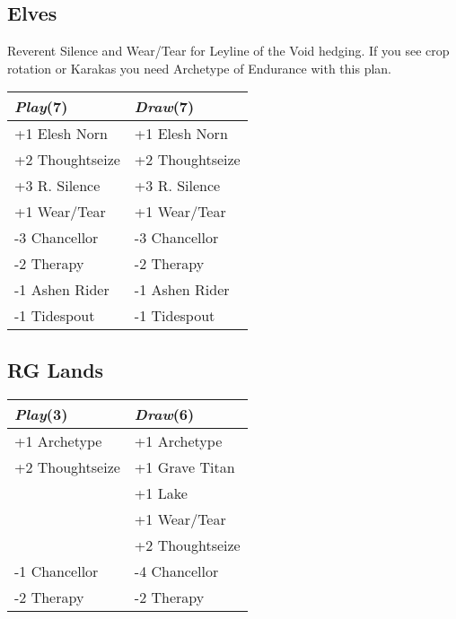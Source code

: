 \documentclass{article}
\renewcommand *\contentsname{Contents}
\begin{document}
\begin{multicols}{2}
\subsection*{Elves}
Reverent Silence and Wear/Tear for Leyline of the Void hedging. If you see crop rotation or Karakas you need Archetype of Endurance with this plan.\begin{center}
\begin{tabular}{| l | l |}
\hline
\textit{Play}(7) & \textit{Draw}(7) \\
\hline
\cellcolor[HTML]{BBDDBB}\small{+1 Elesh Norn} & \cellcolor[HTML]{BBDDBB}\small{+1 Elesh Norn}\\
\cellcolor[HTML]{BBDDBB}\small{+2 Thoughtseize} & \cellcolor[HTML]{BBDDBB}\small{+2 Thoughtseize}\\
\cellcolor[HTML]{BBDDBB}\small{+3 R. Silence} & \cellcolor[HTML]{BBDDBB}\small{+3 R. Silence}\\
\cellcolor[HTML]{BBDDBB}\small{+1 Wear/Tear} & \cellcolor[HTML]{BBDDBB}\small{+1 Wear/Tear}\\
\cellcolor[HTML]{DDBBBB}\small{-3 Chancellor} & \cellcolor[HTML]{DDBBBB}\small{-3 Chancellor}\\
\cellcolor[HTML]{DDBBBB}\small{-2 Therapy} & \cellcolor[HTML]{DDBBBB}\small{-2 Therapy}\\
\cellcolor[HTML]{DDBBBB}\small{-1 Ashen Rider} & \cellcolor[HTML]{DDBBBB}\small{-1 Ashen Rider}\\
\cellcolor[HTML]{DDBBBB}\small{-1 Tidespout} & \cellcolor[HTML]{DDBBBB}\small{-1 Tidespout}\\
\hline
\end{tabular}
\end{center}
\subsection*{RG Lands}
\begin{center}
\begin{tabular}{| l | l |}
\hline
\textit{Play}(3) & \textit{Draw}(6) \\
\hline
\cellcolor[HTML]{BBDDBB}\small{+1 Archetype} & \cellcolor[HTML]{BBDDBB}\small{+1 Archetype}\\
\cellcolor[HTML]{BBDDBB}\small{+2 Thoughtseize} & \cellcolor[HTML]{BBDDBB}\small{+1 Grave Titan}\\
 & \cellcolor[HTML]{BBDDBB}\small{+1 Lake}\\
 & \cellcolor[HTML]{BBDDBB}\small{+1 Wear/Tear}\\
 & \cellcolor[HTML]{BBDDBB}\small{+2 Thoughtseize}\\
\cellcolor[HTML]{DDBBBB}\small{-1 Chancellor} & \cellcolor[HTML]{DDBBBB}\small{-4 Chancellor}\\
\cellcolor[HTML]{DDBBBB}\small{-2 Therapy} & \cellcolor[HTML]{DDBBBB}\small{-2 Therapy}\\
\hline
\end{tabular}
\end{center}

\end{multicols}
\end{document}
